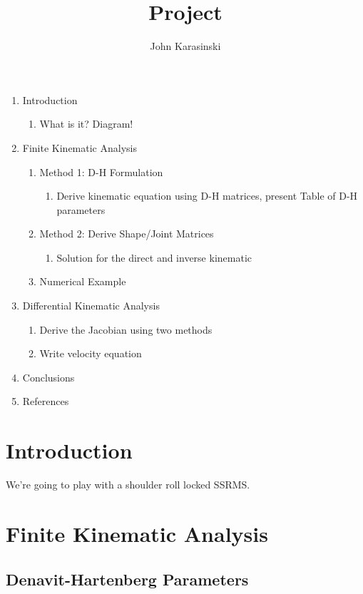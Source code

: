 \documentclass[onecolumn,10pt]{jhwhw}
\author{John Karasinski}
\title{Project}
\begin{document}

\begin{enumerate}
  \item Introduction
    \begin{enumerate}
      \item What is it? Diagram!
    \end{enumerate}
  \item Finite Kinematic Analysis
    \begin{enumerate}
      \item Method 1: D-H Formulation
        \begin{enumerate}
          \item Derive kinematic equation using D-H matrices, present Table of D-H parameters
        \end{enumerate}
      \item Method 2: Derive Shape/Joint Matrices
        \begin{enumerate}
          \item Solution for the direct and inverse kinematic
        \end{enumerate}
      \item Numerical Example
    \end{enumerate}
  \item Differential Kinematic Analysis
    \begin{enumerate}
      \item Derive the Jacobian using two methods
      \item Write velocity equation
    \end{enumerate}
  \item Conclusions
  \item References
\end{enumerate}

\section{Introduction}
We're going to play with a shoulder roll locked SSRMS.

\section{Finite Kinematic Analysis}
\subsection{Denavit-Hartenberg Parameters}
\end{document}
